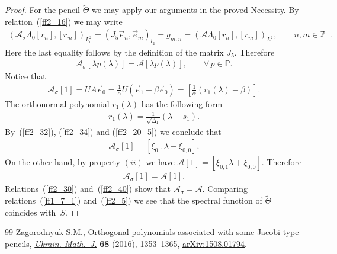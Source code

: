 \documentclass[11pt]{article}
\numberwithin{equation}{section}
\begin{document}
\begin{proof}
For the pencil $\widetilde\Theta$ we may apply our arguments in the proved Necessity. By relation~(\ref{ff2_16}) we may write
\begin{gather*} (\mathcal{A}_\sigma \Lambda_0 [r_n],[r_m])_{L^2_\sigma} = (J_5 \vec e_n, \vec e_m)_{l_2} = g_{m,n} = (\mathcal{A} \Lambda_0 [r_n],[r_m])_{L^2_\sigma},\qquad n,m\in\mathbb{Z}_+. \end{gather*}
Here the last equality follows by the def\/inition of the matrix $J_5$. Therefore
\begin{gather}\label{ff2_30}
\mathcal{A}_\sigma [ \lambda p(\lambda) ] = \mathcal{A} [ \lambda p(\lambda) ],\qquad \forall\, p\in\mathbb{P}.
\end{gather}
Notice that
\begin{gather}\label{ff2_32}
\mathcal{A}_\sigma [ 1 ] = U A \vec e_0 =\frac{1}{\alpha} U (\vec e_1 - \beta \vec e_0)=\left[ \frac{1}{\alpha} (r_1(\lambda) - \beta) \right].
\end{gather}
The orthonormal polynomial $r_1(\lambda)$ has the following form
\begin{gather}\label{ff2_34}
r_1(\lambda) = \frac{1}{\sqrt{\Delta_1}} (\lambda - s_1).
\end{gather}
By~(\ref{ff2_32}), (\ref{ff2_34}) and (\ref{ff2_20_5}) we conclude that
\begin{gather*} \mathcal{A}_\sigma [ 1 ] = [ \xi_{0,1} \lambda + \xi_{0,0} ]. \end{gather*}
On the other hand, by property $(ii)$ we have $\mathcal{A} [ 1 ] = [ \xi_{0,1} \lambda + \xi_{0,0} ]$. Therefore
\begin{gather}\label{ff2_40}
\mathcal{A}_\sigma [ 1 ] = \mathcal{A} [ 1 ].
\end{gather}
Relations~(\ref{ff2_30}) and~(\ref{ff2_40}) show that $\mathcal{A}_\sigma = \mathcal{A}$. Comparing relations~(\ref{ff1_7_1}) and~(\ref{ff2_5}) we see that the spectral function of $\widetilde\Theta$ coincides with~$S$.
\end{proof}
\begin{thebibliography}{99}
Zagorodnyuk S.M., Orthogonal polynomials associated with some {J}acobi-type
 pencils, \href{https://doi.org/10.1007/s11253-017-1300-3}{\textit{Ukrain. Math.~J.}} \textbf{68} (2016), 1353--1365,
 \href{https://arxiv.org/abs/1508.01794}{arXiv:1508.01794}.

\end{thebibliography}
\end{document}
